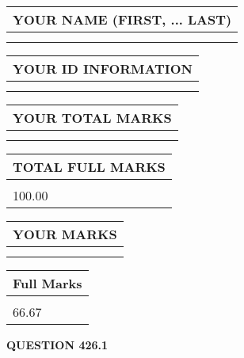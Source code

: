 \documentclass{ctexart}
\begin{document}
   
   
   
\newpage 
\setcounter{page}{ 
   426001 } 
   
   
   
   
\noindent\begin{tabular}{|l|}
\hline
YOUR NAME (FIRST, ... LAST)  \\
\hline
 \\ 
 \\ 
\hline
\end{tabular}
\hspace{0.05in} \begin{tabular}{|l|}
\hline
 YOUR   ID   INFORMATION  \\
\hline
 \\ 
 \\ 
\hline
\end{tabular}
   
   
\vspace{0.2in}\noindent\begin{tabular}{|l|}
\hline
YOUR TOTAL MARKS  \\
\hline
 \\ 
 \\ 
\hline
\end{tabular}
\hspace{0.05in} \begin{tabular}{|l|}
\hline
TOTAL FULL MARKS  \\
\hline
 \\ 
100.00 \\
\hline
\end{tabular}
   
   
 \vspace{0.2in}
 
 
 
 
   
   
  
\vspace{0.2in}
  
\noindent\begin{tabular}{|l|}
\hline
 YOUR MARKS  \\
\hline
 \\ 
 \\ 
\hline
\end{tabular}
\hspace{0.05in} \begin{tabular}{|l|}
\hline
 Full Marks  \\
\hline
 \\ 
66.67 \\
\hline
\end{tabular}
{\textbf{\Large{QUESTION
426.1 
}}}
  
\end{document}
